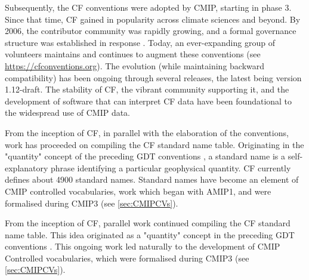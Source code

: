 \documentclass[manuscript]{copernicus}
\newcommand{\mycomment}[1]{}
\begin{document}
Subsequently, the CF conventions were adopted by CMIP, starting in phase 3. Since that time, CF gained in popularity across climate sciences and beyond. By 2006, the contributor community was rapidly growing, and a formal governance structure was established in response \citep{lawrence_maintaining_2006}. Today, an ever-expanding group of volunteers maintains and continues to augment these conventions (see \url{https://cfconventions.org}). The evolution (while maintaining backward compatibility) has been ongoing through several releases, the latest being version 1.12-draft. The stability of CF, the vibrant community supporting it, and the development of software that can interpret CF data have been foundational to the widespread use of CMIP data.

From the inception of CF, in parallel with the elaboration of the conventions, work has proceeded on compiling the CF standard name table. Originating in the "quantity" concept of the preceding GDT conventions \citep{gregory_gdt_1999}, a standard name is a self-explanatory phrase identifying a particular geophysical quantity. CF currently defines about 4900 standard names. Standard names have become an element of CMIP controlled vocabularies, work which began with AMIP1, and were formalised during CMIP3 (see \autoref{sec:CMIPCVs}).

From the inception of CF, parallel work continued compiling the CF standard name table. This idea originated as a "quantity" concept in the preceding GDT conventions \citep{gregory_gdt_1999}. This ongoing work led naturally to the development of CMIP Controlled vocabularies, which were formalised during CMIP3 (see \autoref{sec:CMIPCVs}).

\mycomment{
https://www.unidata.ucar.edu/software/netcdf/conventions.html
https://www.unidata.ucar.edu/software/netcdf/coords/proposals.html
COARDS 1995 - https://web.archive.org/web/20100527095818/http://ferret.wrc.noaa.gov/noaa_coop/coop_cdf_profile.html
GDT 1997
https://www.unidata.ucar.edu/mailing_lists/archives/netcdfgroup/1997/msg00080.html
https://www.unidata.ucar.edu/software/netcdf/coords/0054.html 1997
https://web.archive.org/web/20100610102527/http://www-pcmdi.llnl.gov/drach/GDT_convention.html 1999
https://web.archive.org/web/20040604041414/http://www-pcmdi.llnl.gov/drach/netCDF.html
CF 2003 - https://cfconventions.org/Data/cf-conventions/cf-conventions-1.11/cf-conventions.html#_version_1_0_28_october_2003 
}
\end{document}
